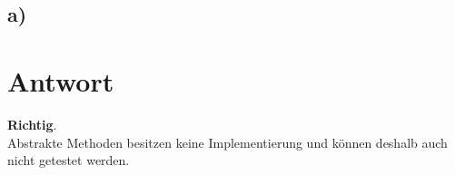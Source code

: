 \subsection*{a)}

\section*{Antwort}

\textbf{Richtig}.\\
Abstrakte Methoden besitzen keine Implementierung und können deshalb auch nicht getestet werden.